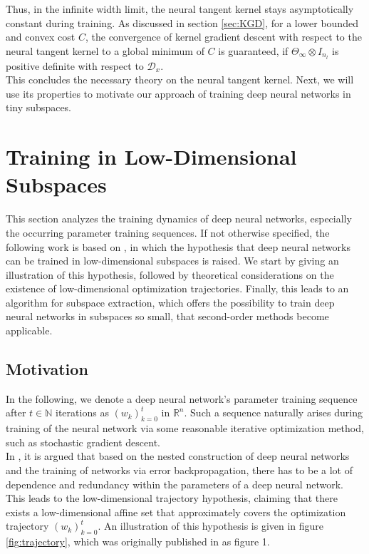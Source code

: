 \documentclass[11pt, a4paper]{article}
\newcommand{\N}{\mathbb{N}}
\newcommand{\R}{\mathbb{R}}
\newcommand{\D}{\mathcal{D}}
\begin{document}
Thus, in the infinite width limit, the neural tangent kernel stays asymptotically constant during training. As discussed in section \ref{sec:KGD}, for a lower bounded and convex cost $C$, the convergence of kernel gradient descent with respect to the neural tangent kernel to a global minimum of $C$ is guaranteed, if $\Theta_{\infty} \otimes I_{n_l}$ is positive definite with respect to $\D_x$. \\

This concludes the necessary theory on the neural tangent kernel. Next, we will use its properties to motivate our approach of training deep neural networks in tiny subspaces.

\pagebreak
\section{Training in Low-Dimensional Subspaces} \label{sec:subspaces}

This section analyzes the training dynamics of deep neural networks, especially the occurring parameter training sequences.
If not otherwise specified, the following work is based on \cite{Paper}, in which the hypothesis that deep neural networks can be trained in low-dimensional subspaces is raised. We start by giving an illustration of this hypothesis, followed by theoretical considerations on the existence of low-dimensional optimization trajectories. Finally, this leads to an algorithm for subspace extraction, which offers the possibility to train deep neural networks in subspaces so small, that second-order methods become applicable.

\subsection{Motivation}

In the following, we denote a deep neural network's parameter training sequence after $t \in \N$ iterations as $(w_k)_{k=0}^t$ in $\R^n$. Such a sequence naturally arises during training of the neural network via some reasonable iterative optimization method, such as stochastic gradient descent. \\

In \cite{Paper}, it is argued that based on the nested construction of deep neural networks and the training of networks via error backpropagation, there has to be a lot of dependence and redundancy within the parameters of a deep neural network. This leads to the low-dimensional trajectory hypothesis, claiming that there exists a low-dimensional affine set that approximately covers the optimization trajectory $(w_k)_{k=0}^t$. An illustration of this hypothesis is given in figure \ref{fig:trajectory}, which was originally published in \cite{Paper} as figure 1.
\end{document}
